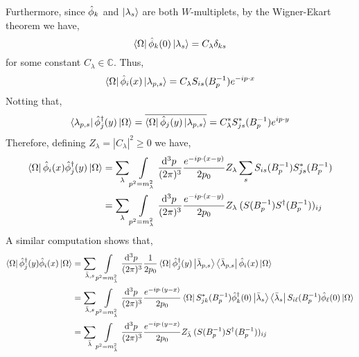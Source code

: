 \documentclass[12pt]{extarticle}
\newcommand{\dn}[2]{ \mathrm{d}^{#1} #2 \:}
\theoremstyle{definition}
\newcommand{\C}{\mathbb{C}}
\begin{document}
Furthermore, since $\hat{\phi}_k$ and $\left| \lambda_s \right>$ are both $W$-multiplets, by the Wigner-Ekart theorem we have,
\begin{equation}
\left< \Omega \right| \hat{\phi}_k(0) \left| \lambda_{s} \right> = C_\lambda \delta_{ks}
\end{equation}
for some constant $C_\lambda \in \C$. Thus,
\begin{equation}
\left< \Omega \right| \hat{\phi}_i(x) \left| \lambda_{p,s} \right> = C_\lambda S_{is}(B_p^{-1})  e^{-i p \cdot x}
\end{equation}
Notting that,
\begin{equation}
\left< \lambda_{p,s} \right| \hat{\phi}^\dagger_j(y) \left| \Omega \right> = \overline{\left< \Omega \right| \hat{\phi}_j(y) \left| \lambda_{p,s} \right>} = C^*_\lambda S^*_{js}(B_p^{-1})  e^{i p \cdot y}
\end{equation}
Therefore, defining $Z_\lambda = |C_\lambda|^2 \ge 0$ we have,
\begin{subequations}
\begin{align}
\bra{\Omega} \ph_i(x) \phd_j(y) \ket{\Omega} &= \sum_{\lambda} \int\limits_{p^2 = m_\lambda^2} \frac{\dn{3}{p}}{(2 \pi)^3} \frac{e^{-i p \cdot (x - y)}}{2 p_0} Z_\lambda \sum_s S_{is}(B_p^{-1}) S^*_{js}(B_p^{-1})
\\
& = \sum_{\lambda} \int\limits_{p^2 = m_\lambda^2} \frac{\dn{3}{p}}{(2 \pi)^3} \frac{e^{-i p \cdot (x - y)}}{2 p_0} Z_\lambda \: (S(B_p^{-1}) S^\dagger(B_p^{-1}))_{ij}
\end{align}
\end{subequations}
A similar computation shows that,
\begin{subequations}
\begin{align}
\bra{\Omega} \phd_j(y) \ph_i(x) \ket{\Omega} 
&= \sum_{\bar{\lambda}, s} \int\limits_{p^2 = m_{\bar{\lambda}}^2} \frac{\dn{3}{p}}{(2 \pi)^3} \frac{1}{2 p_0} \bra{\Omega} \phd_j(y) \ket{\bar{\lambda}_{p,s}} \bra{\bar{\lambda}_{p,s}} \ph_i(x) \ket{\Omega}
\\
& = \sum_{\bar{\lambda}, s} \int\limits_{p^2 =m_{\bar{\lambda}}^2} \frac{\dn{3}{p}}{(2 \pi)^3} \frac{e^{-i p \cdot (y - x)}}{2 p_0} \bra{\Omega} S^*_{jk}(B_p^{-1}) \phd_k(0) \ket{\bar{\lambda}_{s}} \bra{\bar{\lambda}_{s}} S_{i\ell}(B_p^{-1}) \ph_\ell(0) \ket{\Omega}
\\
& = \sum_{\bar{\lambda}} \int\limits_{p^2 = m_{\bar{\lambda}}^2} \frac{\dn{3}{p}}{(2 \pi)^3} \frac{e^{-i p \cdot (y - x)}}{2 p_0} Z_{\bar{\lambda}} \: (S(B_p^{-1}) S^\dagger(B_p^{-1}))_{ij}
\end{align}
\end{subequations}
\end{document}
